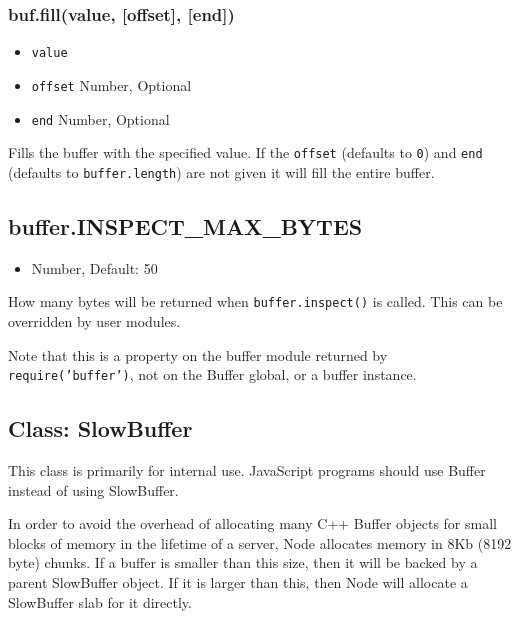 \subsubsection{buf.fill(value, {[}offset{]}, {[}end{]})}

\begin{itemize}
\item
  \texttt{value}
\item
  \texttt{offset} Number, Optional
\item
  \texttt{end} Number, Optional
\end{itemize}

Fills the buffer with the specified value. If the \texttt{offset}
(defaults to \texttt{0}) and \texttt{end} (defaults to
\texttt{buffer.length}) are not given it will fill the entire buffer.

\begin{Shaded}
\begin{Highlighting}[]
  \NormalTok{);}
\NormalTok{(}\NormalTok{);}
\end{Highlighting}
\end{Shaded}

\subsection{buffer.INSPECT\_MAX\_BYTES}

\begin{itemize}
\item
  Number, Default: 50
\end{itemize}

How many bytes will be returned when \texttt{buffer.inspect()} is
called. This can be overridden by user modules.

Note that this is a property on the buffer module returned by
\texttt{require('buffer')}, not on the Buffer global, or a buffer
instance.

\subsection{Class: SlowBuffer}

This class is primarily for internal use. JavaScript programs should use
Buffer instead of using SlowBuffer.

In order to avoid the overhead of allocating many C++ Buffer objects for
small blocks of memory in the lifetime of a server, Node allocates
memory in 8Kb (8192 byte) chunks. If a buffer is smaller than this size,
then it will be backed by a parent SlowBuffer object. If it is larger
than this, then Node will allocate a SlowBuffer slab for it directly.

